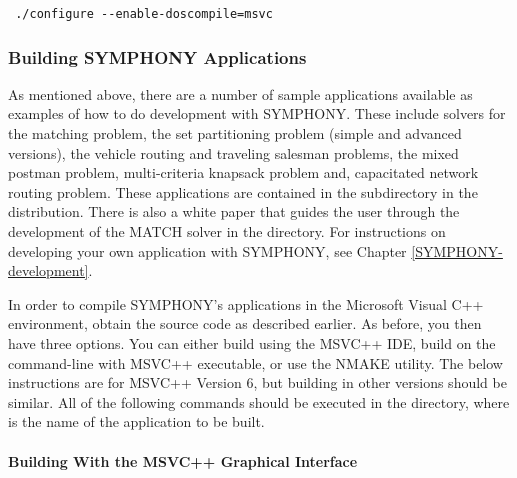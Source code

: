 {\color{Brown}
\begin{verbatim}
 ./configure --enable-doscompile=msvc
\end{verbatim}}

\subsubsection{Building SYMPHONY Applications}
\label{build_appl_msvc}

As mentioned above, there are a number of sample applications available as
examples of how to do development with SYMPHONY. These include solvers for the
matching problem, the set partitioning problem (simple and advanced versions),
the vehicle routing and traveling salesman problems, the mixed postman
problem, multi-criteria knapsack problem and, capacitated network routing
problem. These applications are contained in the 
subdirectory in the distribution. There is also a white paper that guides the
user through the development of the MATCH solver in the 
directory. For instructions on developing your own application with SYMPHONY,
see Chapter \ref{SYMPHONY-development}.

In order to compile SYMPHONY's applications in the Microsoft Visual C++
environment, obtain the source code as described earlier. As before, you then
have three options. You can either build using the MSVC++ IDE, build on the
command-line with MSVC++ executable, or use the NMAKE utility. The below
instructions are for MSVC++ Version 6, but building in other versions should
be similar. All of the following commands should be executed in the
 directory,
where  is the name of the application to be built.

\paragraph{Building With the MSVC++ Graphical Interface}

